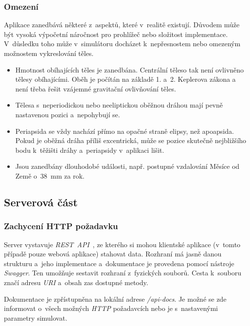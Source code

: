 \documentclass[a4paper,12pt]{article}
\begin{document}
\subsubsection{Omezení}

Aplikace zanedbává některé z~aspektů, které v~realitě existují. Důvodem může být vysoká výpočetní náročnost pro prohlížeč nebo složitost implementace. V~důsledku toho může v~simulátoru docházet k~nepřesnostem nebo omezeným možnostem vykreslování těles.

\begin{itemize}
\item Hmotnost obíhajících těles je zanedbána. Centrální těleso tak není ovlivněno tělesy obíhajícími. Oběh je počítán na základě 1. a~2. Keplerova zákona a není třeba řešit vzájemné gravitační ovlivňování těles.
\item Tělesa s~neperiodickou nebo neeliptickou oběžnou dráhou mají pevně nastavenou pozici a~nepohybují se.
\item Periapsida se vždy nachází přímo na opačné straně elipsy, než apoapsida. Pokud je oběžná dráha příliš excentrická, může se pozice skutečně nejbližšího bodu k~těžišti dráhy a~periapsidy v~aplikaci lišit.

\item Jsou zanedbány dlouhodobé události, např. postupné vzdalování Měsíce od Země o~38~mm za rok.~\cite{rees}
\end{itemize}

\subsection{Serverová část}

\subsubsection{Zachycení HTTP požadavku}

Server vystavuje \textit{REST~API}~\cite{nodebook}, ze kterého si mohou klientské aplikace (v~tomto případě pouze webová aplikace) stahovat data. Rozhraní má jasně danou strukturu a~jeho implementace a~dokumentace je provedena pomocí nástroje \textit{Swagger}. Ten umožňuje sestavit rozhraní z~fyzických souborů. Cesta k~souboru značí adresu \textit{URI} a~obsah zas dostupné metody.



Dokumentace je zpřístupněna na lokální adrese \textit{/api-docs}. Je možné se zde informovat o~všech možných \textit{HTTP} požadavcích nebo je s~nastavenými parametry simulovat.
\end{document}
